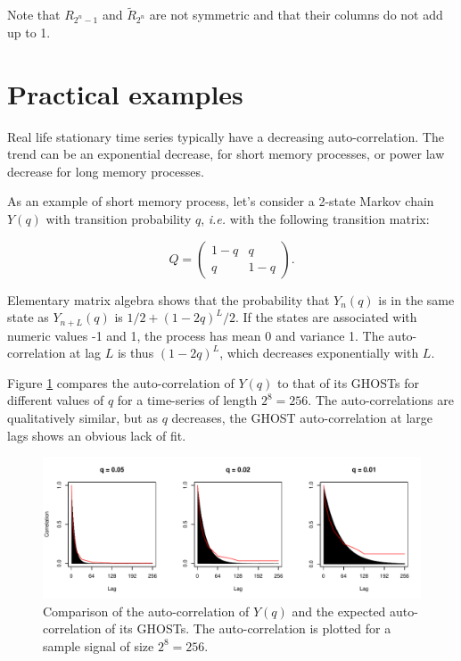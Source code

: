 \documentclass[12pt]{article}
\begin{document}
  Note that $R_{2^n-1}$ and $\tilde{R}_{2^n}$ are not symmetric
  and that their columns do not add up to 1.

  \section{Practical examples}

  Real life stationary time series typically have a decreasing
  auto-correlation. The trend can be an exponential decrease, for short
  memory processes, or power law decrease for long memory processes.

  As an example of short memory process, let's consider a 2-state
  Markov chain $Y(q)$ with transition probability $q$, \textit{i.e.}
  with the following transition matrix:

  \begin{equation*}
    Q = \left( \begin{array}{cc}
      1-q & q \\
      q & 1-q
    \end{array} \right).
  \end{equation*}

  Elementary matrix algebra shows that the probability that $Y_n(q)$
  is in the same state as $Y_{n+L}(q)$ is $1/2+(1-2q)^L/2$.
  If the states are associated with numeric values -1 and 1, the
  process has mean 0 and variance 1. The auto-correlation at lag $L$
  is thus $(1-2q)^L$, which decreases exponentially with $L$.

  Figure \ref{shortmem1} compares the auto-correlation of $Y(q)$ to that
  of its GHOSTs for different values of $q$ for a time-series of length
  $2^8=256$. The auto-correlations are qualitatively similar,
  but as $q$ decreases, the GHOST auto-correlation at large
  lags shows an obvious lack of fit.

  \begin{figure}[t] 
  \centering
  \includegraphics[scale=.7]{practical-short-mem-1_GF110907.pdf}
  \caption{Comparison of the auto-correlation of $Y(q)$ and the expected
  auto-correlation of its GHOSTs. The auto-correlation is plotted for
  a sample signal of size $2^8=256$.}
  \label{shortmem1}
  \end{figure}
\end{document}
